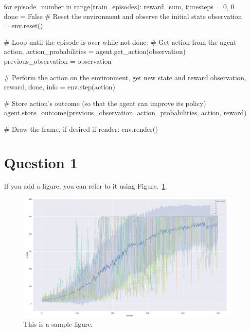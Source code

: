 \documentclass[12pt]{article}
\begin{document}
\begin{pycode}
for episode_number in range(train_episodes):
    reward_sum, timesteps = 0, 0
    done = False
    # Reset the environment and observe the initial state
    observation = env.reset()

    # Loop until the episode is over
    while not done:
        # Get action from the agent
        action, action_probabilities = agent.get_action(observation)
        previous_observation = observation

        # Perform the action on the environment, get new state and reward
        observation, reward, done, info = env.step(action)

        # Store action's outcome (so that the agent can improve its policy)
        agent.store_outcome(previous_observation, action_probabilities, action, reward)

        # Draw the frame, if desired
        if render:
            env.render()
\end{pycode}

\section{Question 1}

If you add a figure, you can refer to it using Figure.~\ref*{fig:fig1}.

\begin{figure}[h] 
	\centering  %
    \includegraphics[width=0.9\columnwidth]{img/training.pdf}
	\caption{This is a sample figure.}
	\label{fig:fig1}
\end{figure}


\end{document}
